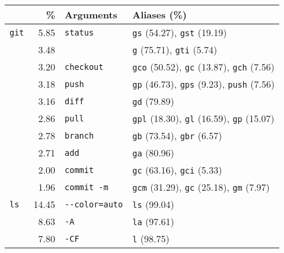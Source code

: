 \newcommand{\numx}[1]{{\footnotesize (\num{#1})}}
\begin{tabular}{@{}l@{}rll@{}}
    \toprule
                &           \% &            Arguments &                                                                 Aliases (\%) \\
    \midrule
     \verb|git| &   \num{5.85} &        \verb|status| &                              \verb|gs| \numx{54.27}, \verb|gst| \numx{19.19} \\
                &   \num{3.48} &              \verb|| &                                \verb|g| \numx{75.71}, \verb|gti| \numx{5.74} \\
                &   \num{3.20} &      \verb|checkout| &      \verb|gco| \numx{50.52}, \verb|gc| \numx{13.87}, \verb|gch| \numx{7.56} \\
                &   \num{3.18} &          \verb|push| &      \verb|gp| \numx{46.73}, \verb|gps| \numx{9.23}, \verb|push| \numx{7.56} \\
                &   \num{3.16} &          \verb|diff| &                                                       \verb|gd| \numx{79.89} \\
                &   \num{2.86} &          \verb|pull| &      \verb|gpl| \numx{18.30}, \verb|gl| \numx{16.59}, \verb|gp| \numx{15.07} \\
                &   \num{2.78} &        \verb|branch| &                               \verb|gb| \numx{73.54}, \verb|gbr| \numx{6.57} \\
                &   \num{2.71} &           \verb|add| &                                                       \verb|ga| \numx{80.96} \\
                &   \num{2.00} &        \verb|commit| &                               \verb|gc| \numx{63.16}, \verb|gci| \numx{5.33} \\
                &   \num{1.96} &     \verb|commit -m| &       \verb|gcm| \numx{31.29}, \verb|gc| \numx{25.18}, \verb|gm| \numx{7.97} \\
    \midrule
      \verb|ls| &  \num{14.45} &  \verb|--color=auto| &                                                       \verb|ls| \numx{99.04} \\
                &   \num{8.63} &            \verb|-A| &                                                       \verb|la| \numx{97.61} \\
                &   \num{7.80} &           \verb|-CF| &                                                        \verb|l| \numx{98.75} \\

\end{tabular}
